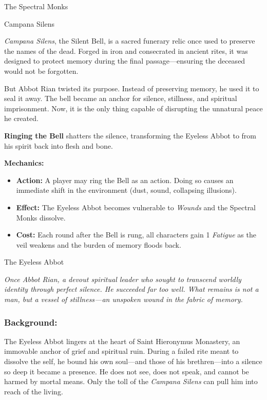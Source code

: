 \begin{multicols}{2}
\begin{NPC}[%
	description=Lingering echoes bound in silence,%
]{The Spectral Monks}
\end{NPC}

\enlargethispage{\baselineskip}
\vspace{\baselineskip}
\begin{CommentBox}{Campana Silens}\raggedright
    \emph{Campana Silens}, the Silent Bell, is a sacred funerary relic once used to preserve the names of the dead. Forged in iron and consecrated in ancient rites, it was designed to protect memory during the final passage—ensuring the deceased would not be forgotten.
    
    But Abbot Rian twisted its purpose. Instead of preserving memory, he used it to seal it away. The bell became an anchor for silence, stillness, and spiritual imprisonment. Now, it is the only thing capable of disrupting the unnatural peace he created.
    
    \vspace{0.5\baselineskip}\noindent
    \textbf{Ringing the Bell} shatters the silence, transforming the Eyeless Abbot to from his spirit back into flesh and bone.
    
    \vspace{0.5\baselineskip}
    \textbf{Mechanics:}
    \begin{itemize}
        \item \textbf{Action:} A player may ring the Bell as an action. Doing so causes an immediate shift in the environment (dust, sound, collapsing illusions).
        \item \textbf{Effect:} The Eyeless Abbot becomes vulnerable to \emph{Wounds} and the Spectral Monks dissolve.
        \item \textbf{Cost:} Each round after the Bell is rung, all characters gain 1 \emph{Fatigue} as the veil weakens and the burden of memory floods back.
    \end{itemize}
\end{CommentBox}

\newcolumn

\begin{NPC}[description=Silence Incarnate]{The Eyeless Abbot}

    \emph{Once Abbot Rian, a devout spiritual leader who sought to transcend worldly identity through perfect silence. He succeeded far too well. What remains is not a man, but a vessel of stillness—an unspoken wound in the fabric of memory.}

    \subsubsection*{Background:}
    The Eyeless Abbot lingers at the heart of Saint Hieronymus Monastery, an immovable anchor of grief and spiritual ruin. During a failed rite meant to dissolve the self, he bound his own soul—and those of his brethren—into a silence so deep it became a presence. He does not see, does not speak, and cannot be harmed by mortal means. Only the toll of the \emph{Campana Silens} can pull him into reach of the living.


\end{NPC}
\end{multicols}
